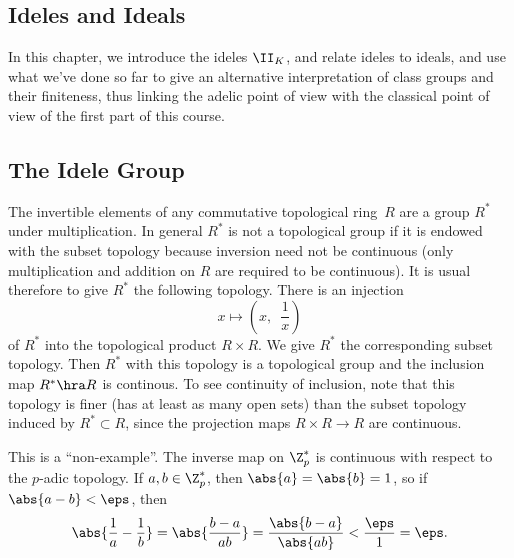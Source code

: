 \documentclass[11pt]{book}
\begin{document}
\begin{ch}
\chapter{Ideles and Ideals}
In this chapter, we introduce the ideles $\II_K$, and relate ideles to
ideals, and use what we've done so far to give an alternative
interpretation of class groups and their finiteness, thus linking the
adelic point of view with the classical point of view of the first
part of this course.



\section{The Idele Group}
The invertible elements of any commutative
topological ring~$R$ are a group $R^*$ under multiplication.
In general $R^*$ is not a topological group if it is
endowed with the subset topology because inversion need
not be continuous (only multiplication and addition on
$R$ are required to be continuous).  It is usual therefore
to give $R^*$ the following topology.
There is an injection
\begin{equation}\label{eqn:prod_embed}
  x\mapsto \left( x, \,\,\,\frac{1}{x} \right)
\end{equation}
of $R^*$ into the topological product $R\times R$.  We give $R^*$ the
corresponding subset topology.  Then $R^*$ with this topology is a
topological group and the inclusion map $R^*\hra R$ is continous.  To
see continuity of inclusion, note that this topology is finer (has at
least as many open sets) than the subset topology induced by
$R^*\subset R$, since the projection maps $R\times R\to R$ are
continuous.

\begin{example}\label{ex:cont}
This is a ``non-example''. The inverse map on $\Z_p^*$ is continuous with
respect to the $p$-adic topology.  If $a,b\in \Z_p^*$,
then $\abs{a}=\abs{b}=1$, so if $\abs{a-b}<\eps$, then
$$
  \abs{\frac{1}{a} - \frac{1}{b}}
   = \abs{\frac{b-a}{ab}} = \frac{\abs{b-a}}{\abs{ab}} < \frac{\eps}{1}=\eps.
$$
\end{example}


\end{ch}
\end{document}

